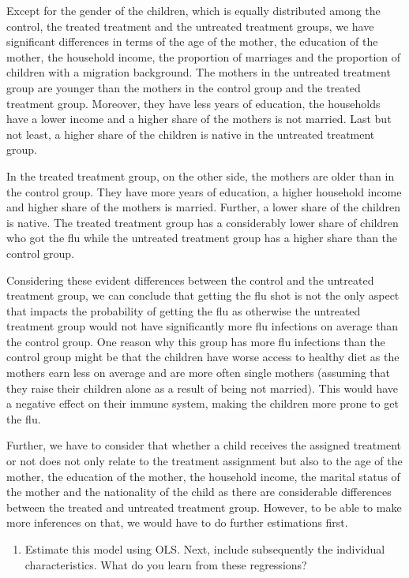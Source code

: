 \documentclass[
]{article}
\providecommand{\tightlist}{%
  \setlength{\itemsep}{0pt}\setlength{\parskip}{0pt}}
\begin{document}
Except for the gender of the children, which is equally distributed
among the control, the treated treatment and the untreated treatment
groups, we have significant differences in terms of the age of the
mother, the education of the mother, the household income, the
proportion of marriages and the proportion of children with a migration
background. The mothers in the untreated treatment group are younger
than the mothers in the control group and the treated treatment group.
Moreover, they have less years of education, the households have a lower
income and a higher share of the mothers is not married. Last but not
least, a higher share of the children is native in the untreated
treatment group.

In the treated treatment group, on the other side, the mothers are older
than in the control group. They have more years of education, a higher
household income and higher share of the mothers is married. Further, a
lower share of the children is native. The treated treatment group has a
considerably lower share of children who got the flu while the untreated
treatment group has a higher share than the control group.

Considering these evident differences between the control and the
untreated treatment group, we can conclude that getting the flu shot is
not the only aspect that impacts the probability of getting the flu as
otherwise the untreated treatment group would not have significantly
more flu infections on average than the control group. One reason why
this group has more flu infections than the control group might be that
the children have worse access to healthy diet as the mothers earn less
on average and are more often single mothers (assuming that they raise
their children alone as a result of being not married). This would have
a negative effect on their immune system, making the children more prone
to get the flu.

Further, we have to consider that whether a child receives the assigned
treatment or not does not only relate to the treatment assignment but
also to the age of the mother, the education of the mother, the
household income, the marital status of the mother and the nationality
of the child as there are considerable differences between the treated
and untreated treatment group. However, to be able to make more
inferences on that, we would have to do further estimations first.

\begin{enumerate}
\def\labelenumi{\alph{enumi})}
\setcounter{enumi}{3}
\tightlist
\item
  Estimate this model using OLS. Next, include subsequently the
  individual characteristics. What do you learn from these regressions?
\end{enumerate}
\end{document}
